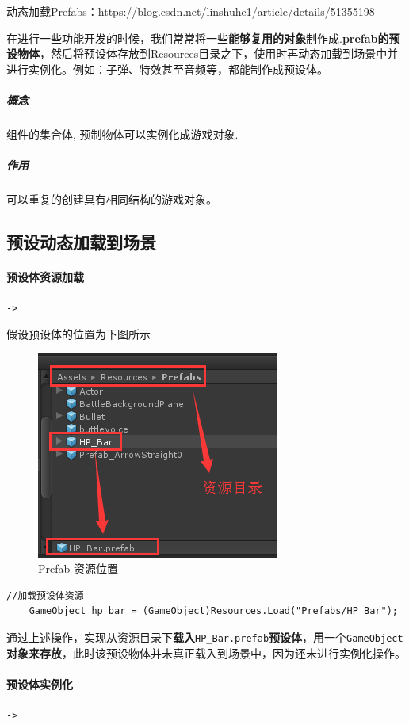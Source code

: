 \documentclass[UTF8,a4paper,12pt]{ctexbook}
\begin{document}
		动态加载Prefabs：\url{https://blog.csdn.net/linshuhe1/article/details/51355198}
		
		在进行一些功能开发的时候，我们常常将一些\textbf{能够复用的对象}制作成.\textbf{prefab的预设物体}，然后将预设体存放到Resources目录之下，使用时再动态加载到场景中并进行实例化。例如：子弹、特效甚至音频等，都能制作成预设体。
		
		\subparagraph{概念} 组件的集合体, 预制物体可以实例化成游戏对象.
		\subparagraph{作用} 可以重复的创建具有相同结构的游戏对象。	
		
		\subsection{预设动态加载到场景}
			\paragraph{预设体资源加载}\verb|->|
			
				假设预设体的位置为下图所示
				\begin{figure}[H]
					\centering
					\includegraphics[scale=0.6]{Prefab-1.png}
					\caption{Prefab 资源位置}
				\end{figure}
			
				\begin{lstlisting}[xleftmargin = .079\textwidth, frame = L]
	//加载预设体资源
	GameObject hp_bar = (GameObject)Resources.Load("Prefabs/HP_Bar");				
				\end{lstlisting}
				
			通过上述操作，实现从资源目录下\textbf{载入}\verb|HP_Bar.prefab|\textbf{预设体}，\textbf{用}一个\verb|GameObject|\textbf{对象来存放}，此时该预设物体并未真正载入到场景中，因为还未进行实例化操作。
			
			\paragraph{预设体实例化}\verb|->|
			
\end{document}
